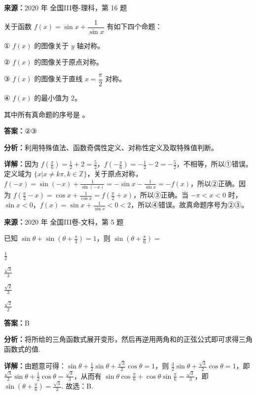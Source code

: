 \begin{question}[points=5]
\textbf{来源：}2020 年 全国III卷-理科，第 16 题\par
关于函数 $f(x)=\sin x+\dfrac{1}{\sin x}$ 有如下四个命题：

① $f(x)$ 的图像关于 $y$ 轴对称。

② $f(x)$ 的图像关于原点对称。

③ $f(x)$ 的图像关于直线 $x=\dfrac{\pi}{2}$ 对称。

④ $f(x)$ 的最小值为 $2$。

其中所有真命题的序号是 。
\fillin[{$②③$}]
\begin{solution}
\textbf{答案：}$②③$

\textbf{分析：}利用特殊值法、函数奇偶性定义、对称性定义及取特殊值判断。

\textbf{详解：}因为 $f\left(\frac{\pi}{6}\right)=\frac12+2=\frac52$，$f\left(-\frac{\pi}{6}\right)=-\frac12-2=-\frac52$，不相等，所以①错误。定义域为 $\{x|x\neq k\pi,k\in\mathbb{Z}\}$，关于原点对称，$f(-x)=\sin(-x)+\frac{1}{\sin(-x)}=-\sin x-\frac{1}{\sin x}=-f(x)$，所以②正确。因为 $f\left(\frac{\pi}{2}-x\right)=\cos x+\frac{1}{\cos x}=f\left(\frac{\pi}{2}+x\right)$，所以③正确。当 $-\pi<x<0$ 时，$\sin x<0$，$f(x)=\sin x+\frac{1}{\sin x}<0<2$，所以④错误。故真命题序号为②③。
\end{solution}
\end{question}

\begin{question}[points=5]
\textbf{来源：}2020 年 全国III卷-文科，第 5 题\par
已知 $\sin\theta+\sin(\theta+\frac{\pi}{3})=1$，则 $\sin(\theta+\frac{\pi}{6})=$
\begin{choices}
  \item $\frac{1}{2}$
  \item $\frac{\sqrt{3}}{3}$
  \item $\frac{\sqrt{2}}{3}$
  \item $\frac{\sqrt{2}}{2}$
\end{choices}
\begin{solution}
\textbf{答案：}B

\textbf{分析：}将所给的三角函数式展开变形，然后再逆用两角和的正弦公式即可求得三角函数式的值.

\textbf{详解：}由题意可得：$\sin\theta+\frac{1}{2}\sin\theta+\frac{\sqrt{3}}{2}\cos\theta=1$，则 $\frac{3}{2}\sin\theta+\frac{\sqrt{3}}{2}\cos\theta=1$，即 $\frac{\sqrt{3}}{2}\sin\theta+\frac{1}{2}\cos\theta=\frac{\sqrt{3}}{3}$，从而有 $\sin\theta\cos\frac{\pi}{6}+\cos\theta\sin\frac{\pi}{6}=\frac{\sqrt{3}}{3}$，即 $\sin(\theta+\frac{\pi}{6})=\frac{\sqrt{3}}{3}$. 故选：B.
\end{solution}
\end{question}

